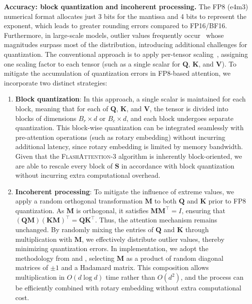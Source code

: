 \begin{enumerate}
\textbf{Accuracy: block quantization and incoherent processing.} The FP8 (e4m3) numerical format allocates just 3 bits for the mantissa and 4 bits to represent the exponent, which leads to greater rounding errors compared to FP16/BF16. Furthermore, in large-scale models, outlier values frequently occur~\citep{dettmers2208llm, sun2024massive} whose magnitudes surpass most of the distribution, introducing additional challenges for quantization. The conventional approach is to apply per-tensor scaling~\citep{micikevicius2022fp8}, assigning one scaling factor to each tensor (such as a single scalar for $\mathbf{Q}$, $\mathbf{K}$, and $\mathbf{V}$). To mitigate the accumulation of quantization errors in FP8-based attention, we incorporate two distinct strategies:

\begin{enumerate}

\item \textbf{Block quantization}: In this approach, a single scalar is maintained for each block, meaning that for each of $\mathbf{Q}$, $\mathbf{K}$, and $\mathbf{V}$, the tensor is divided into blocks of dimensions $B_r \times d$ or $B_c \times d$, and each block undergoes separate quantization. This block-wise quantization can be integrated seamlessly with pre-attention operations (such as rotary embedding) without incurring additional latency, since rotary embedding is limited by memory bandwidth. Given that the \textsc{FlashAttention-3} algorithm is inherently block-oriented, we are able to rescale every block of $\mathbf{S}$ in accordance with block quantization without incurring extra computational overhead.

\item \textbf{Incoherent processing}: To mitigate the influence of extreme values, we apply a random orthogonal transformation $\mathbf{M}$ to both $\mathbf{Q}$ and $\mathbf{K}$ prior to FP8 quantization. As $\mathbf{M}$ is orthogonal, it satisfies $\mathbf{M} \mathbf{M}^\top = I$, ensuring that $(\mathbf{Q} \mathbf{M}) (\mathbf{K} \mathbf{M})^\top = \mathbf{Q} \mathbf{K}^\top$. Thus, the attention mechanism remains unchanged. By randomly mixing the entries of $\mathbf{Q}$ and $\mathbf{K}$ through multiplication with $\mathbf{M}$, we effectively distribute outlier values, thereby minimizing quantization errors. In implementation, we adopt the methodology from \citet{chee2024quip} and \citet{tseng2024quip}, selecting $\mathbf{M}$ as a product of random diagonal matrices of $\pm 1$ and a Hadamard matrix. This composition allows multiplication in $O(d \log d)$ time rather than $O(d^2)$, and the process can be efficiently combined with rotary embedding without extra computational cost.


\end{enumerate}
\end{enumerate}

